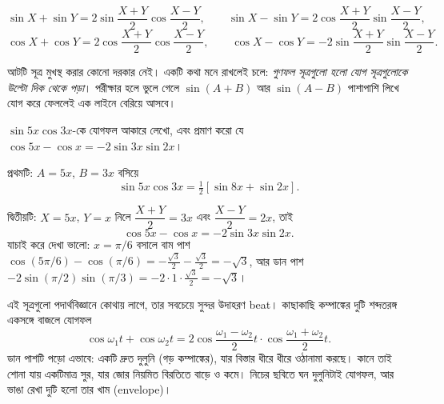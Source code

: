 \documentclass[11pt]{article}
\begin{document}
\begin{idea}
\[
  \sin X + \sin Y = 2\sin\frac{X+Y}{2}\cos\frac{X-Y}{2}, \qquad
  \sin X - \sin Y = 2\cos\frac{X+Y}{2}\sin\frac{X-Y}{2} ,
\]
\[
  \cos X + \cos Y = 2\cos\frac{X+Y}{2}\cos\frac{X-Y}{2}, \qquad
  \cos X - \cos Y = -2\sin\frac{X+Y}{2}\sin\frac{X-Y}{2} .
\]
\end{idea}

আটটি সূত্র মুখস্থ করার কোনো দরকার নেই। একটি কথা মনে রাখলেই চলে: \emph{গুণফল
সূত্রগুলো হলো যোগ সূত্রগুলোকে উল্টো দিক থেকে পড়া}। পরীক্ষার হলে ভুলে গেলে
$\sin(A+B)$ আর $\sin(A-B)$ পাশাপাশি লিখে যোগ করে ফেললেই এক লাইনে বেরিয়ে আসবে।

\begin{example}
$\sin 5x\cos 3x$-কে যোগফল আকারে লেখো, এবং প্রমাণ করো যে
$\cos 5x - \cos x = -2\sin 3x\sin 2x$।
\end{example}

\begin{solbox}
প্রথমটি: $A = 5x$, $B = 3x$ বসিয়ে
\[
  \sin 5x\cos 3x = \tfrac{1}{2}\left[ \sin 8x + \sin 2x \right] .
\]

দ্বিতীয়টি: $X = 5x$, $Y = x$ নিলে $\dfrac{X+Y}{2} = 3x$ এবং
$\dfrac{X-Y}{2} = 2x$, তাই
\[
  \cos 5x - \cos x = -2\sin 3x\sin 2x .
\]
যাচাই করে দেখা ভালো: $x = \pi/6$ বসালে বাম পাশ
$\cos(5\pi/6) - \cos(\pi/6) = -\tfrac{\sqrt{3}}{2} - \tfrac{\sqrt{3}}{2}
= -\sqrt{3}$, আর ডান পাশ
$-2\sin(\pi/2)\sin(\pi/3) = -2 \cdot 1 \cdot \tfrac{\sqrt{3}}{2} = -\sqrt{3}$।
\end{solbox}

\begin{remark}
এই সূত্রগুলো পদার্থবিজ্ঞানে কোথায় লাগে, তার সবচেয়ে সুন্দর উদাহরণ beat। কাছাকাছি
কম্পাঙ্কের দুটি শব্দতরঙ্গ একসঙ্গে বাজলে যোগফল
\[
  \cos\omega_{1}t + \cos\omega_{2}t
  = 2\cos\frac{\omega_{1}-\omega_{2}}{2}t \cdot
    \cos\frac{\omega_{1}+\omega_{2}}{2}t .
\]
ডান পাশটি পড়ো এভাবে: একটি দ্রুত দুলুনি (গড় কম্পাঙ্কের), যার বিস্তার ধীরে ধীরে
ওঠানামা করছে। কানে তাই শোনা যায় একটিমাত্র সুর, যার জোর নিয়মিত বিরতিতে বাড়ে ও
কমে। নিচের ছবিতে ঘন দুলুনিটাই যোগফল, আর ভাঙা রেখা দুটি হলো তার খাম (envelope)।
\end{remark}

\begin{center}
\end{center}
\end{document}
